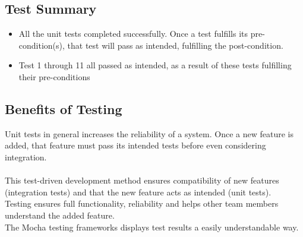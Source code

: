 \documentclass{article}
\begin{document}
\subsection{Test Summary}
\begin{itemize} 
\item All the unit tests completed successfully. Once a test fulfills its pre-condition(s), that test will pass as intended, fulfilling the post-condition. 
\item Test 1 through 11 all passed as intended, as a result of these tests fulfilling their pre-conditions
\end{itemize}
\subsection{Benefits of Testing}
Unit tests in general increases the reliability of a system. Once a new feature is added, that feature must pass its intended tests before even considering integration.\\ \\ This test-driven development method ensures compatibility of new features (integration tests) and that the new feature acts as intended (unit tests). \\
Testing ensures full functionality, reliability and helps other team members understand the added feature. \\ 
The Mocha testing frameworks displays test results a easily understandable way.
\end{document}
